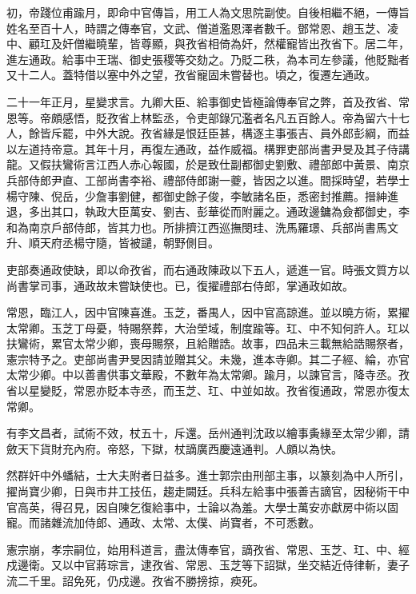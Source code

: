 \begin{pinyinscope}
初，帝踐位甫踰月，即命中官傳旨，用工人為文思院副使。自後相繼不絕，一傳旨姓名至百十人，時謂之傳奉官，文武、僧道濫恩澤者數千。鄧常恩、趙玉芝、凌中、顧玒及奸僧繼曉輩，皆尊顯，與孜省相倚為奸，然權寵皆出孜省下。居二年，進左通政。給事中王瑞、御史張稷等交劾之。乃貶二秩，為本司左參議，他貶黜者又十二人。蓋特借以塞中外之望，孜省寵固未嘗替也。頃之，復遷左通政。

二十一年正月，星變求言。九卿大臣、給事御史皆極論傳奉官之弊，首及孜省、常恩等。帝頗感悟，貶孜省上林監丞，令吏部錄冗濫者名凡五百餘人。帝為留六十七人，餘皆斥罷，中外大說。孜省緣是恨廷臣甚，構逐主事張吉、員外郎彭綱，而益以左道持帝意。其年十月，再復左通政，益作威福。構罪吏部尚書尹旻及其子侍講龍。又假扶鸞術言江西人赤心報國，於是致仕副都御史劉敷、禮部郎中黃景、南京兵部侍郎尹直、工部尚書李裕、禮部侍郎謝一夔，皆因之以進。間採時望，若學士楊守陳、倪岳，少詹事劉健，都御史餘子俊，李敏諸名臣，悉密封推薦。搢紳進退，多出其口，執政大臣萬安、劉吉、彭華從而附麗之。通政邊鏞為僉都御史，李和為南京戶部侍郎，皆其力也。所排擠江西巡撫閔珪、洗馬羅璟、兵部尚書馬文升、順天府丞楊守隨，皆被譴，朝野側目。

吏部奏通政使缺，即以命孜省，而右通政陳政以下五人，遞進一官。時張文質方以尚書掌司事，通政故未嘗缺使也。已，復擢禮部右侍郎，掌通政如故。

常恩，臨江人，因中官陳喜進。玉芝，番禺人，因中官高諒進。並以曉方術，累擢太常卿。玉芝丁母憂，特賜祭葬，大治塋域，制度踰等。玒、中不知何許人。玒以扶鸞術，累官太常少卿，喪母賜祭，且給贈誥。故事，四品未三載無給誥賜祭者，憲宗特予之。吏部尚書尹旻因請並贈其父。未幾，進本寺卿。其二子經、綸，亦官太常少卿。中以善書供事文華殿，不數年為太常卿。踰月，以諫官言，降寺丞。孜省以星變貶，常恩亦貶本寺丞，而玉芝、玒、中並如故。孜省復通政，常恩亦復太常卿。

有李文昌者，試術不效，杖五十，斥還。岳州通判沈政以繪事夤緣至太常少卿，請斂天下貨財充內府。帝怒，下獄，杖謫廣西慶遠通判。人頗以為快。

然群奸中外蟠結，士大夫附者日益多。進士郭宗由刑部主事，以篆刻為中人所引，擢尚寶少卿，日與市井工技伍，趨走闕廷。兵科左給事中張善吉謫官，因秘術干中官高英，得召見，因自陳乞復給事中，士論以為羞。大學士萬安亦獻房中術以固寵。而諸雜流加侍郎、通政、太常、太僕、尚寶者，不可悉數。

憲宗崩，孝宗嗣位，始用科道言，盡汰傳奉官，謫孜省、常恩、玉芝、玒、中、經戍邊衛。又以中官蔣琮言，逮孜省、常恩、玉芝等下詔獄，坐交結近侍律斬，妻子流二千里。詔免死，仍戍邊。孜省不勝搒掠，瘐死。


\end{pinyinscope}
